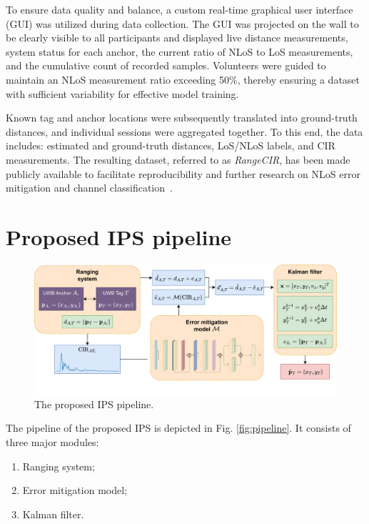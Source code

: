 To ensure data quality and balance, a custom real-time graphical user interface (GUI) was utilized during data collection. The GUI was projected on the wall to be clearly visible to all participants and displayed live distance measurements, system status for each anchor, the current ratio of NLoS to LoS measurements, and the cumulative count of recorded samples. Volunteers were guided to maintain an NLoS measurement ratio exceeding 50\%, thereby ensuring a dataset with sufficient variability for effective model training.

Known tag and anchor locations were subsequently translated into ground-truth distances, and individual sessions were aggregated together. To this end, the data includes: estimated and ground-truth distances, LoS/NLoS labels, and CIR measurements. The resulting dataset, referred to as \textit{RangeCIR}, has been made publicly available to facilitate reproducibility and further research on NLoS error mitigation and channel classification~\cite{yaroshevych_2025_rangecir}.

\section{Proposed IPS pipeline}

\begin{figure}[tbh]
\includegraphics[width=\textwidth]{Graphics/pipeline.pdf}
\centering
\caption{The proposed IPS pipeline.}
\label{fig:pipeline}
\end{figure}

The pipeline of the proposed IPS is depicted in Fig. \autoref{fig:pipeline}. It consists of three major modules: 

\begin{enumerate}
    \item Ranging system;
    \item Error mitigation model;
    \item Kalman filter.
\end{enumerate}

